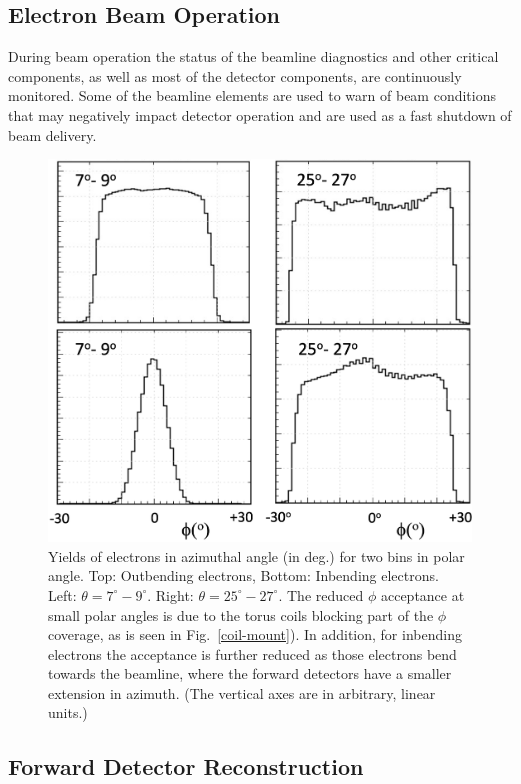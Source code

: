 \documentclass[final,3p]{elsarticle}
\begin{document}
\begin{twocolumn}
\section{Electron Beam Operation} 

During beam operation the status of the beamline diagnostics and other critical components, as well as most of the 
detector components, are continuously monitored. Some of the beamline elements are used to warn of beam conditions
that may negatively impact detector operation and are used as a fast shutdown of beam delivery.    

\begin{figure}[t!]
\centerline{\includegraphics[width=1.0\columnwidth]{e1_R1_phi-out-in.png}}
\caption{Yields of electrons in azimuthal angle (in deg.) for two bins in polar angle. Top: Outbending electrons, Bottom:
  Inbending electrons. Left: $\theta = 7^\circ-9^\circ$. Right: $\theta = 25^\circ-27^\circ$. The reduced $\phi$
  acceptance at small polar angles is due to the torus coils blocking part of the $\phi$ coverage, as is seen in
  Fig.~\ref{coil-mount}). In addition, for inbending electrons the acceptance is further reduced as those electrons
  bend towards the beamline, where the forward detectors have a smaller extension in azimuth. (The vertical axes are
  in arbitrary, linear units.)}
\label{e-accept-in}
\end{figure}

\subsection{Forward Detector Reconstruction} 


\end{twocolumn}
\end{document}

